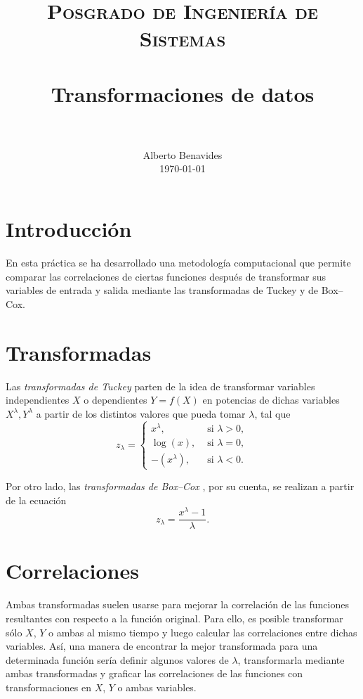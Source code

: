 \documentclass[paper=leter, fontsize=11pt]{scrartcl}
\title{
		\usefont{OT1}{bch}{b}{n}
		\normalfont \normalsize \textsc{Posgrado de Ingeniería de Sistemas} \\ [25pt]
		\horrule{0.5pt} \\[0.4cm]
		\huge Transformaciones de datos \\
		\horrule{2pt} \\[0.5cm]
}
\author{
		\normalfont 								\normalsize
        Alberto Benavides\\[-3pt]		\normalsize
        \today
}
\date{}
\numberwithin{equation}{section}		%
\numberwithin{figure}{section}			%
\numberwithin{table}{section}				%
\begin{document}
\maketitle

\section{Introducción}
En esta práctica se ha desarrollado una metodología computacional que permite comparar las correlaciones de ciertas funciones después de transformar sus variables de entrada y salida mediante las transformadas de Tuckey y de Box--Cox.

\section{Transformadas}

Las \emph{transformadas de Tuckey} \citep*{tuckey} parten de la idea de transformar variables independientes $X$ o dependientes $Y = f(X)$ en potencias de dichas variables $X^\lambda, Y^\lambda$ a partir de los distintos valores que pueda tomar $\lambda$, tal que
\begin{equation}
    z_\lambda = \left \{
        \begin{array}{ll}
        x^\lambda, & \text{ si } \lambda > 0, \\
                    \log (x), & \text{ si } \lambda = 0, \\
                    -(x^\lambda), & \text{ si } \lambda < 0.
        \end{array}
        \right .
\end{equation}

Por otro lado, las \emph{transformadas de Box--Cox} \citep*{boxcox}, por su cuenta, se realizan a partir de la ecuación
\begin{equation}
    z_\lambda = \frac{x^\lambda - 1}{\lambda}.
\end{equation}

\section{Correlaciones}

Ambas transformadas suelen usarse para mejorar la correlación de las funciones resultantes con respecto a la función original. Para ello, es posible transformar sólo $X$, $Y$ o ambas al mismo tiempo y luego calcular las correlaciones entre dichas variables. Así, una manera de encontrar la mejor transformada para una determinada función sería definir algunos valores de $\lambda$, transformarla mediante ambas transformadas y graficar las correlaciones de las funciones con transformaciones en $X$, $Y$ o ambas variables.
\end{document}
